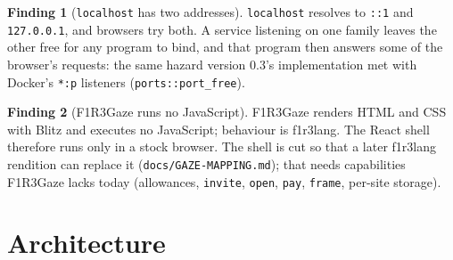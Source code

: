 \documentclass[11pt]{article}
\theoremstyle{definition}
\newtheorem{finding}{Finding}
\theoremstyle{remark}
\newcommand{\code}[1]{\texttt{#1}}
\newcommand{\Gz}{F1R3Gaze}
\begin{document}
\begin{finding}[\code{localhost} has two addresses]\label{f:dualstack}
\code{localhost} resolves to \code{::1} and \code{127.0.0.1}, and browsers try both.
A service listening on one family leaves the other free for any program to bind, and
that program then answers some of the browser's requests: the same hazard version
0.3's implementation met with Docker's \code{*:p} listeners (\code{ports::port\_free}).
\end{finding}

\begin{finding}[\Gz{} runs no JavaScript]\label{f:gazejs}
\Gz{} renders HTML and CSS with Blitz and executes no JavaScript; behaviour is
f1r3lang. The React shell therefore runs only in a stock browser. The shell is cut so
that a later f1r3lang rendition can replace it (\code{docs/GAZE-MAPPING.md}); that
needs capabilities \Gz{} lacks today (allowances, \code{invite}, \code{open},
\code{pay}, \code{frame}, per-site storage).
\end{finding}

\section{Architecture}\label{sec:arch}
\end{document}
